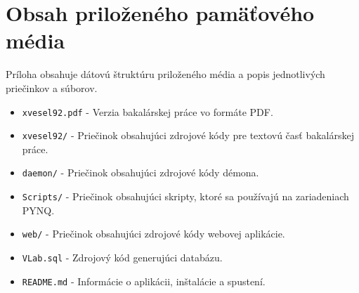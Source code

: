 
%

\chapter{Obsah priloženého pamäťového média}
Príloha obsahuje dátovú štruktúru priloženého média a popis jednotlivých priečinkov a súborov.

\begin{itemize}
    \item \verb|xvesel92.pdf| - Verzia bakalárskej práce vo formáte PDF.
    \item \verb|xvesel92/| - Priečinok obsahujúci zdrojové kódy pre textovú časť bakalárskej práce.
    \item \verb|daemon/| - Priečinok obsahujúci zdrojové kódy démona.
    \item \verb|Scripts/| - Priečinok obsahujúci skripty, ktoré sa používajú na zariadeniach PYNQ.
    \item \verb|web/| - Priečinok obsahujúci zdrojové kódy webovej aplikácie.
    \item \verb|VLab.sql| - Zdrojový kód generujúci databázu.
    \item \verb|README.md| - Informácie o aplikácii, inštalácie a spustení.
\end{itemize}






